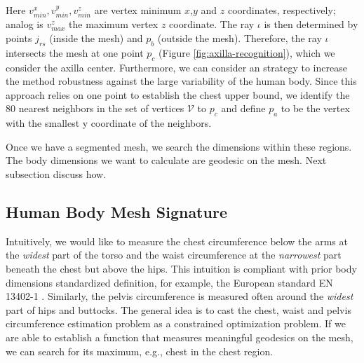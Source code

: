 \documentclass[runningheads, orivec]{llncs}
\begin{document}
Here $v^x_{min}, v^y_{min}, v^z_{min}$ are vertex minimum $x$,$y$ and $z$ 
coordinates, respectively; analog is $v^z_{max}$ the maximum vertex $z$ 
coordinate. The ray 
$\iota$ is then determined by points $j_{rs}$ (inside the mesh) and $p_b$ 
(outside the mesh). Therefore, the ray $\iota$ intersects the mesh at one point 
$p_c$ (Figure \ref{fig:axilla-recognition}), which we consider the axilla 
center. Furthermore, we can consider an strategy to increase the method 
robustness against the large variability of the human body. Since this approach 
relies on one point to establish the chest upper bound, we identify the 80 
nearest neighbors in the set of vertices $\mathcal{V}$ to $p_c$ and define 
$p_a$ to be the vertex with the smallest y coordinate of the neighbors.  

Once we have a segmented mesh, we search the dimensions within 
these regions. The body dimensions we want to calculate are 
geodesic on the mesh. Next subsection discuss how.


\subsection{Human Body Mesh Signature}\label{subsec:hbm_signature}
Intuitively, we would like to measure the chest circumference below the arms 
at the \textit{widest} part of the torso and the waist circumference at the 
\textit{narrowest} part beneath the chest but above the hips. This intuition is 
compliant 
with prior body dimensions standardized definition, for example, the European 
standard EN 13402-1 \cite{en13402-1}. Similarly, the pelvis 
circumference is measured often around the \textit{widest} part of hips and 
buttocks. The general idea is to cast the chest, waist and pelvis circumference 
estimation problem as a constrained optimization problem. If we are able to 
establish a 
function that measures meaningful geodesics on the mesh, we can search for its 
maximum, 
e.g., chest in the chest region.
\end{document}
